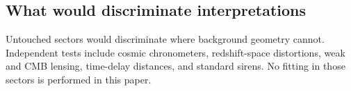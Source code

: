 \subsection{What would discriminate interpretations}
\label{sec:discriminate}

Untouched sectors would discriminate where background geometry
cannot. Independent tests include cosmic chronometers, redshift-space
distortions, weak and CMB lensing, time-delay distances, and standard
sirens. No fitting in those sectors is
performed in this paper.

